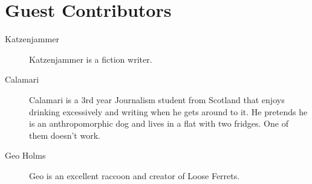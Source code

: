 \section*{Guest Contributors}

\begin{description}
  \item[Katzenjammer] Katzenjammer is a fiction writer.
  \item[Calamari] Calamari is a 3rd year Journalism student from Scotland that enjoys drinking excessively and writing when he gets around to it. He pretends he is an anthropomorphic dog and lives in a flat with two fridges. One of them doesn't work.
  \item[Geo Holms] Geo is an excellent raccoon and creator of Loose Ferrets.
\end{description}
